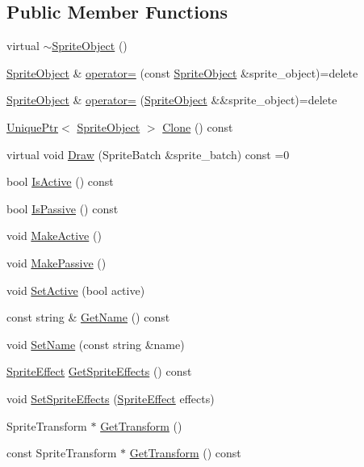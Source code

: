 \subsection*{Public Member Functions}
\begin{DoxyCompactItemize}
\item 
virtual \hyperlink{classmage_1_1_sprite_object_aad4d1472cb468d8c19b61ab030332ceb}{$\sim$\+Sprite\+Object} ()
\item 
\hyperlink{classmage_1_1_sprite_object}{Sprite\+Object} \& \hyperlink{classmage_1_1_sprite_object_ab24af642e7c49a13ca5526248f106b4e}{operator=} (const \hyperlink{classmage_1_1_sprite_object}{Sprite\+Object} \&sprite\+\_\+object)=delete
\item 
\hyperlink{classmage_1_1_sprite_object}{Sprite\+Object} \& \hyperlink{classmage_1_1_sprite_object_a0d098954e6ef5b331b2b7e6f6cb3c21e}{operator=} (\hyperlink{classmage_1_1_sprite_object}{Sprite\+Object} \&\&sprite\+\_\+object)=delete
\item 
\hyperlink{namespacemage_a8c307fbcc33bce9b7f2aa4c26c3b95cf}{Unique\+Ptr}$<$ \hyperlink{classmage_1_1_sprite_object}{Sprite\+Object} $>$ \hyperlink{classmage_1_1_sprite_object_a761528ee815cbac83f9a490e07752e5c}{Clone} () const
\item 
virtual void \hyperlink{classmage_1_1_sprite_object_a1c1c885fe7846f7ee1cc0b73571c2fa0}{Draw} (Sprite\+Batch \&sprite\+\_\+batch) const =0
\item 
bool \hyperlink{classmage_1_1_sprite_object_ac6eb3126b6caebc416ec2a112a907b55}{Is\+Active} () const
\item 
bool \hyperlink{classmage_1_1_sprite_object_ae410ef3f14a7b621e28c066a23575fd0}{Is\+Passive} () const
\item 
void \hyperlink{classmage_1_1_sprite_object_a11056bf3002461e38f8780e2bfc31db3}{Make\+Active} ()
\item 
void \hyperlink{classmage_1_1_sprite_object_a536fead50b0e4049e1c74b359a491529}{Make\+Passive} ()
\item 
void \hyperlink{classmage_1_1_sprite_object_ad42b0aa80333e21df4855a36d738ba97}{Set\+Active} (bool active)
\item 
const string \& \hyperlink{classmage_1_1_sprite_object_aceda3826a222603d30e2d2b827f491bb}{Get\+Name} () const
\item 
void \hyperlink{classmage_1_1_sprite_object_a784cd7d61f3a9f71a521656ae3199366}{Set\+Name} (const string \&name)
\item 
\hyperlink{namespacemage_a9cfe18123066ba4236f548f9de75d881}{Sprite\+Effect} \hyperlink{classmage_1_1_sprite_object_af759fd1b68e2707b0f084da183e0b5f1}{Get\+Sprite\+Effects} () const
\item 
void \hyperlink{classmage_1_1_sprite_object_ad2eb556b5965d894e81cca96c5c0540b}{Set\+Sprite\+Effects} (\hyperlink{namespacemage_a9cfe18123066ba4236f548f9de75d881}{Sprite\+Effect} effects)
\item 
Sprite\+Transform $\ast$ \hyperlink{classmage_1_1_sprite_object_ab48dfd7c6833067d67634bc89d7cb99c}{Get\+Transform} ()
\item 
const Sprite\+Transform $\ast$ \hyperlink{classmage_1_1_sprite_object_a73733c89ee3c47d0e8b8bb81a06bc48c}{Get\+Transform} () const
\end{DoxyCompactItemize}
